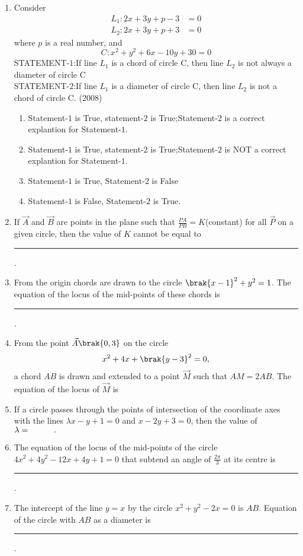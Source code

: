 \begin{enumerate}[label=\thesubsection.\arabic*.,ref=\thesubsection.\theenumi]
\item Consider 
\begin{align*}
	L_1:2x+3y+p-3&=0
	\\
               L_2:2x+3y+p+3&=0
\end{align*}
where $p$ is a real number, and 
		$$	C: x^2+y^2+6x-10y+30=0$$
STATEMENT-$1$:If line $L_1$ is a chord of circle C, then line $L_2$ is not always a diameter of circle C\\
STATEMENT-$2$:If line $L_1$ is a diameter of circle C, then line $L_2$ is not a chord  of circle C. \hfill(2008)
\begin{enumerate}
\item Statement-$1$ is True, statement-$2$ is True;Statement-$2$ is a correct explantion for Statement-$1$.
\item Statement-$1$ is True, statement-$2$ is True;Statement-$2$ is NOT a correct explantion for Statement-$1$.
\item Statement-$1$ is True, Statement-$2$ is False
\item Statement-$1$ is False, Statement-$2$ is True.	
\end{enumerate}
	\item If $\vec{A}$ and $\vec{B}$ are points in the plane such that  $\frac{PA}{PB}=K$(constant) for all $\vec{P}$ on a given circle,  then the value of $K$ cannot be equal to \rule{1cm}{0.01pt}.
		\hfill{}
\item From the origin chords are drawn  to the circle $\brak{x-1}^{2}+y^{2}=1$. The equation of the locus of the mid-points of these chords is
\rule{1cm}{0.01pt}.
	\hfill{}
\item From the point $\vec{A}\brak{0, 3}$ on the circle $$x^{2}+4x+\brak{y-3}^{2}=0,$$  a chord $AB$ is drawn and extended to a point $\vec{M}$ such that $AM=2AB$. The equation of the locus of $\vec{M}$ is 
%
	\hfill{}
\item If a circle passes through the points of intersection of the coordinate axes with the lines $\lambda x-y+1=0$ and $x-2y+3=0$,  then the value of $\lambda =\rule{1cm}{0.01pt}.$
%
	\hfill{}
\item The equation of the locus of the mid-points of the circle $4x^{2}+4y^{2}-12x+4y+1=0$ that subtend an angle of $\frac{2\pi}{3}$ at its centre is \rule{1cm}{0.01pt}.
%
	\hfill{}
\item The intercept of the line $y=x$ by the circle $x^{2}+y^{2}-2x=0$ is $AB$. Equation of the circle with $AB$ as a diameter is \rule{1cm}{0.01pt}.

\end{enumerate}
